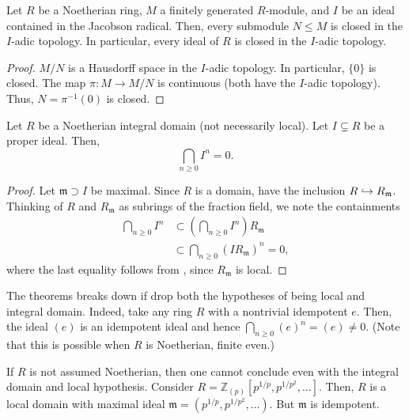 \documentclass[12pt]{article}
\begin{document}
\begin{cor}
	Let $R$ be a Noetherian ring, $M$ a finitely generated $R$-module, and $I$ be an ideal contained in the Jacobson radical. Then, every submodule $N \le M$ is closed in the $I$-adic topology. In particular, every ideal of $R$ is closed in the $I$-adic topology.
\end{cor}
\begin{proof} 
	$M/N$ is a Hausdorff space in the $I$-adic topology. In particular, $\{0\}$ is closed. The map $\pi : M \to M/N$ is continuous (both have the $I$-adic topology). Thus, $N = \pi^{-1}(0)$ is closed.
\end{proof}

\begin{thm}
	Let $R$ be a Noetherian integral domain (not necessarily local). \newline
	Let $I \subsetneq R$ be a proper ideal. Then,
	\begin{equation*} 
		\bigcap_{n \ge 0} I^{n} = 0.
	\end{equation*}
\end{thm}
\begin{proof} 
	Let $\mathfrak{m} \supset I$ be maximal. Since $R$ is a domain, have the inclusion $R \hookrightarrow R_{\mathfrak{m}}$. Thinking of $R$ and $R_{\mathfrak{m}}$ as subrings of the fraction field, we note the containments
	\begin{align*} 
		\bigcap_{n \ge 0} I^{n} &\subset \left(\bigcap_{n \ge 0} I^{n}\right) R_{\mathfrak{m}} \\
		&\subset \bigcap_{n \ge 0} (I R_{\mathfrak{m}})^{n} = 0,
	\end{align*} 
	where the last equality follows from , since $R_{\mathfrak{m}}$ is local.
\end{proof}

\begin{ex}
	The theorems breaks down if drop both the hypotheses of being local and integral domain. \newline
	Indeed, take any ring $R$ with a nontrivial idempotent $e$. Then, the ideal $(e)$ is an idempotent ideal and hence $\bigcap_{n \ge 0} (e)^{n} = (e) \neq 0$. (Note that this is possible when $R$ is Noetherian, finite even.)

	If $R$ is not assumed Noetherian, then one cannot conclude even with the integral domain and local hypothesis. Consider $R = \mathbb{Z}_{(p)}[p^{1/p}, p^{1/p^{2}}, \ldots]$. \newline
	Then, $R$ is a local domain with maximal ideal $\mathfrak{m} = (p^{1/p}, p^{1/p^{2}}, \ldots)$. But $\mathfrak{m}$ is idempotent.
\end{ex}
\end{document}
